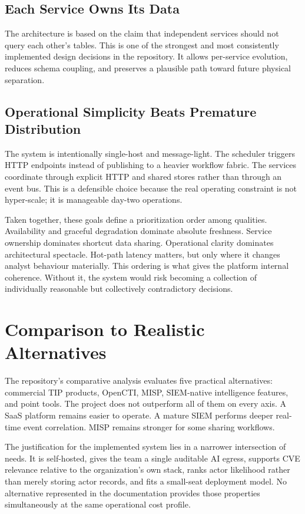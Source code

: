 \subsection{Each Service Owns Its Data}
The architecture is based on the claim that independent services should not query each other's tables. This is one of the strongest and most consistently implemented design decisions in the repository. It allows per-service evolution, reduces schema coupling, and preserves a plausible path toward future physical separation.

\subsection{Operational Simplicity Beats Premature Distribution}
The system is intentionally single-host and message-light. The scheduler triggers HTTP endpoints instead of publishing to a heavier workflow fabric. The services coordinate through explicit HTTP and shared stores rather than through an event bus. This is a defensible choice because the real operating constraint is not hyper-scale; it is manageable day-two operations.

Taken together, these goals define a prioritization order among qualities. Availability and graceful degradation dominate absolute freshness. Service ownership dominates shortcut data sharing. Operational clarity dominates architectural spectacle. Hot-path latency matters, but only where it changes analyst behaviour materially. This ordering is what gives the platform internal coherence. Without it, the system would risk becoming a collection of individually reasonable but collectively contradictory decisions.

\section{Comparison to Realistic Alternatives}
The repository's comparative analysis evaluates five practical alternatives: commercial TIP products, OpenCTI, MISP, SIEM-native intelligence features, and point tools. The project does not outperform all of them on every axis. A SaaS platform remains easier to operate. A mature SIEM performs deeper real-time event correlation. MISP remains stronger for some sharing workflows.

The justification for the implemented system lies in a narrower intersection of needs. It is self-hosted, gives the team a single auditable AI egress, supports CVE relevance relative to the organization's own stack, ranks actor likelihood rather than merely storing actor records, and fits a small-seat deployment model. No alternative represented in the documentation provides those properties simultaneously at the same operational cost profile.

